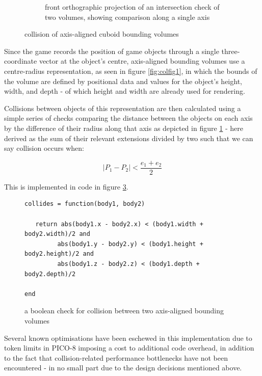 \documentclass[11pt]{article}
\begin{document}
\begin{figure}[h]
\begin{subfigure}{.45\textwidth}
   \caption{front orthographic projection of an intersection check of two volumes, showing comparison along a single axis}
   \label{fig:colfig2}
\end{subfigure}\hfill
\caption{collision of axis-aligned cuboid bounding volumes}
\label{fig:collision}
\end{figure}

Since the game records the position of game objects through a single three-coordinate vector at the object's
centre, axis-aligned bounding volumes use a centre-radius representation\cite[p. 78]{ericson}, as seen in
figure \ref{fig:colfig1}, in which the bounds of the volume are defined by positional data and values for the
object's height, width, and depth - of which height and width are already used for rendering.

Collisions between objects of this representation are then calculated using a simple series of checks comparing
the distance between the objects on each axis by the difference of their radius along that axis as
depicted in figure \ref{fig:colfig2} - here derived as the sum of their relevant extensions divided by two such
that we can say collision occurs when:

\begin{equation}
   |P_1 - P_2| < \frac{e_1 + e_2} {2}
\end{equation}

This is implemented in code in figure \ref{fig:codecollide}.

\begin{figure}[h]
   \begin{lstlisting}
collides = function(body1, body2)

   return abs(body1.x - body2.x) < (body1.width + body2.width)/2 and
         abs(body1.y - body2.y) < (body1.height + body2.height)/2 and
         abs(body1.z - body2.z) < (body1.depth + body2.depth)/2

end
   \end{lstlisting}
   \caption{a boolean check for collision between two axis-aligned bounding volumes}
   \label{fig:codecollide}
\end{figure}

Several known optimisations have been eschewed in this implementation due to token limits in PICO-8
imposing a cost to additional code overhead, in addition to the fact that collision-related performance
bottlenecks have not been encountered - in no small part due to the design decisions mentioned above.
\end{document}
